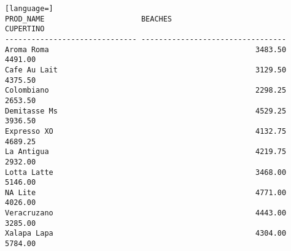 \begin{lstlisting}[language=]
PROD_NAME                      BEACHES                           CUPERTINO                        
------------------------------ --------------------------------- 
Aroma Roma                                               3483.50                           4491.00
Cafe Au Lait                                             3129.50                           4375.50
Colombiano                                               2298.25                           2653.50
Demitasse Ms                                             4529.25                           3936.50
Expresso XO                                              4132.75                           4689.25
La Antigua                                               4219.75                           2932.00
Lotta Latte                                              3468.00                           5146.00
NA Lite                                                  4771.00                           4026.00
Veracruzano                                              4443.00                           3285.00
Xalapa Lapa                                              4304.00                           5784.00
\end{lstlisting}

